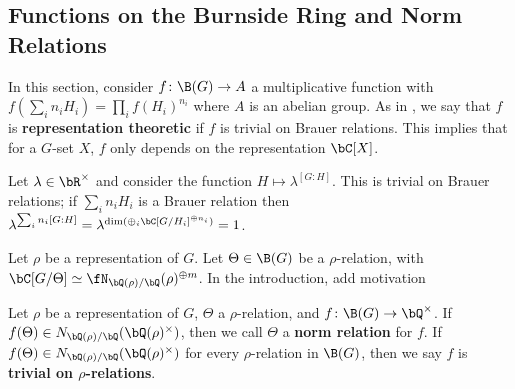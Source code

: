 \subsection{Functions on the Burnside Ring and Norm Relations}\label{sec-norm-rels}

In this section, consider $f \colon \B(G) \to A$ a multiplicative function with $f(\sum_i n_i H_i) = \prod_i f(H_i)^{n_i}$ where $A$ is an abelian group. As in \cite{reg-const}, we say that $f$ is \textbf{representation theoretic} if $f$ is trivial on Brauer relations. This implies that for a $G$-set $X$, $f$ only depends on the representation $\bC[X]$. 

\begin{example}
  Let $\lambda \in \bR^{\times}$ and consider the function $H \mapsto \lambda^{[G : H]}$. This is trivial on Brauer relations;  if $\sum_i n_i H_i$ is a Brauer relation then $\lambda^{\sum_i n_i [G : H]} = \lambda^{\dim( \oplus_i \bC[G / H_i]^{\oplus n_i})} = 1$.
\end{example}

Let $\rho$ be a representation of $G$. Let $\Theta \in \B(G)$ be a $\rho$-relation, with $\bC[G / \Theta] \simeq \repnorm{\rho}^{\oplus m}$. In the introduction, {\color{red} add motivation}

\begin{defn}
Let $\rho$ be a representation of $G$, $\Theta$ a $\rho$-relation, and $f \colon \B(G) \to \bQ^{\times}$. If $f(\Theta) \in \fieldnorm{\rho}$, then we call $\Theta$ a \textbf{norm relation} for $f$. 
If $f(\Theta) \in \fieldnorm{\rho}$ for every $\rho$-relation in $\B(G)$, then we say $f$ is \textbf{trivial on $\rho$-relations}.

\end{defn}



